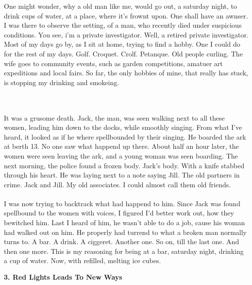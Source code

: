 \documentclass[]{article}
\begin{document}
One might wonder, why a old man like me, would go out, a saturday night, to drink cups of water, at a place, where it's frownt upon. One shall have an awnser. I was there to observe the setting, of a man, who recently died under suspicious conditions. You see, i'm a private investigator. Well, a retired private investigator. Most of my days go by, as I sit at home, trying to find a hobby. One I could do for the rest of my days. Golf. Croquet. Crolf. Petanque. Old people curling. The wife goes to community events, such as garden competitions, amatuer art expeditions and local fairs. So far, the only hobbies of mine, that really has stuck, is stopping my drinking and smokeing. 

\\ \\
It was a grusome death. Jack, the man, was seen walking next to all these women, leading him down to the docks, while smoothly singing. From what I've heard, it looked as if he where spellbounded by their singing. He boarded the ark at berth 13. No one saw what happend up there. About half an hour later, the women were seen leaving the ark, and a young woman was seen boarding. The next morning, the police found a frozen body. Jack's body. With a knife stabbed through his heart. He was laying next to a note saying Jill. The old partners in crime. Jack and Jill. My old associates. I could almost call them old friends.
\\ \\
I was now trying to backtrack what had happend to him. Since Jack was found spellbound to the women with voices, I figured I'd better work out, how they bewitched him. Last I heard of him, he wasn't able to do a job, cause his woman had walked out on him. He properly had turrend to what a broken man normally turns to. A bar. A drink. A ciggeret. Another one. So on, till the last one. And then one more. This is my reasoning for being at a bar, saturday night, drinking a cup of water. Now, with refilled, melting ice cubes.

\begin{center}
	\large\textbf{3. Red Lights Leads To New Ways}
\end{center}
\end{document}
